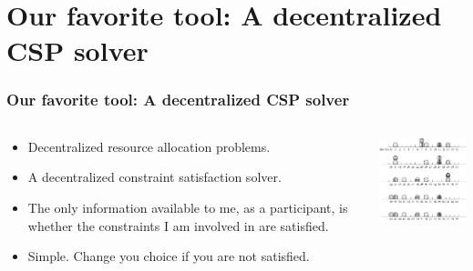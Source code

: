 \documentclass{beamer}
\begin{document}
\section{Our favorite tool: A decentralized CSP solver}
\begin{frame}
  \frametitle{Our favorite tool: A decentralized CSP solver}
  \begin{columns}[t]
      \begin{block}{}
        \begin{itemize}
          \item Decentralized resource allocation problems.
          \item A decentralized constraint satisfaction solver.
          \item The only information available to me, as a participant, is whether the constraints I am involved in are satisfied.
          \item Simple. Change you choice if you are not satisfied.
        \end{itemize}
      \end{block}
      \begin{center}
        \includegraphics[width=1.8in]{figures/csma_eca_compact}
      \end{center}
  \end{columns}
\end{frame}
\end{document}
